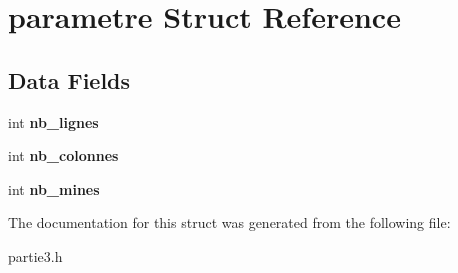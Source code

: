 \hypertarget{structparametre}{
\section{parametre Struct Reference}
\label{structparametre}
}
\subsection*{Data Fields}
\begin{DoxyCompactItemize}
\item 
\hypertarget{structparametre_a07ebd3fcf6bb339077496fa00b10229e}{
int {\bfseries nb\_\-lignes}}
\label{structparametre_a07ebd3fcf6bb339077496fa00b10229e}

\item 
\hypertarget{structparametre_a5e9c499e503b9c6140d90ac6adba32c8}{
int {\bfseries nb\_\-colonnes}}
\label{structparametre_a5e9c499e503b9c6140d90ac6adba32c8}

\item 
\hypertarget{structparametre_ab6ae4bfd2587326fd986664c8c147b9f}{
int {\bfseries nb\_\-mines}}
\label{structparametre_ab6ae4bfd2587326fd986664c8c147b9f}

\end{DoxyCompactItemize}


The documentation for this struct was generated from the following file:\begin{DoxyCompactItemize}
\item 
partie3.h\end{DoxyCompactItemize}
